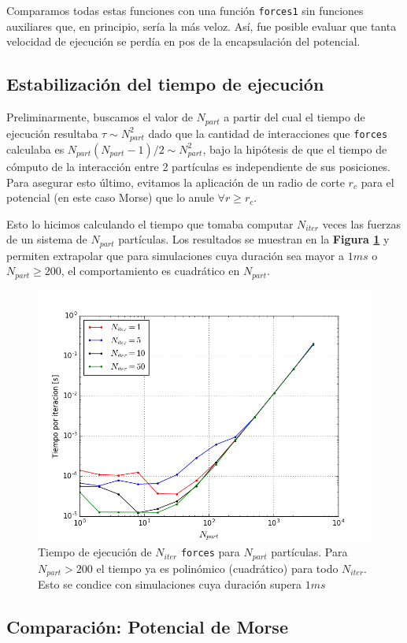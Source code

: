 \documentclass[twoside, 12pt]{article}
\begin{document}
Comparamos todas estas funciones con una función \texttt{forces1} sin funciones auxiliares que, en principio, sería la más veloz. Así, fue posible evaluar que tanta velocidad de ejecución se perdía en pos de la encapsulación del potencial. 

\subsection{Estabilización del tiempo de ejecución}

Preliminarmente, buscamos el valor de $N_{part}$ a partir del cual el tiempo de ejecución resultaba $\tau\sim N_{part}^2$ dado que la cantidad de interacciones que \texttt{forces} calculaba es $N_{part}(N_{part}-1)/2\sim N_{part}^2$, bajo la hipótesis de que el tiempo de cómputo de la interacción entre 2 partículas es independiente de sus posiciones. Para asegurar esto último, evitamos la aplicación de un radio de corte $r_c$ para el potencial (en este caso Morse) que lo anule $\forall r\geq r_c$.

Esto lo hicimos calculando el tiempo que tomaba computar $N_{iter}$ veces las fuerzas de un sistema de $N_{part}$ partículas. Los resultados se muestran en la \textbf{Figura \ref{fig:TvsNpart}} y permiten extrapolar que para simulaciones cuya duraci\'on sea mayor a $1ms$ o $N_{part}\geq200$, el comportamiento es cuadr\'atico en $N_{part}$.

\begin{figure}[h]
	\centering
	\includegraphics[width=0.65\columnwidth]{Estabilizacion_Npart.png}
	\caption{Tiempo de ejecución de $N_{iter}$ \texttt{forces} para $N_{part}$ partículas. Para $N_{part}>200$ el tiempo ya es polinómico (cuadrático) para todo $N_{iter}$. Esto se condice con simulaciones cuya duraci\'on supera $1ms$}
	\label{fig:TvsNpart}
\end{figure}

\subsection{Comparación: Potencial de Morse}
\end{document}
